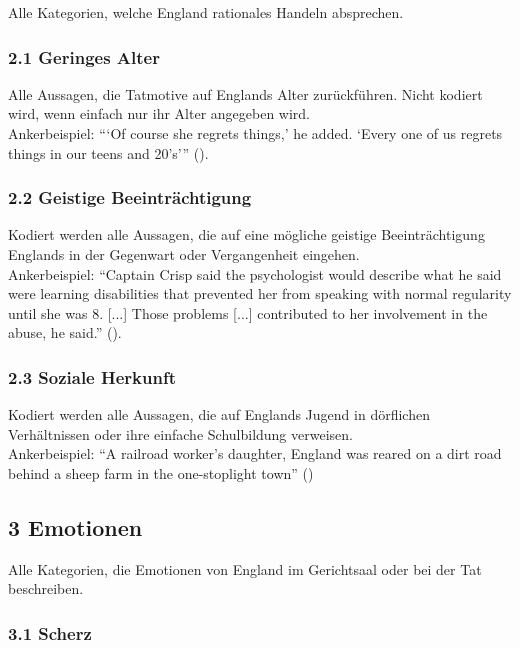 \documentclass[12pt, titlepage=true, toc=bib]{scrartcl}
\begin{document}
Alle Kategorien, welche England rationales Handeln absprechen.

\subsubsection*{2.1 Geringes Alter}

Alle Aussagen, die Tatmotive auf Englands Alter zurückführen. Nicht kodiert wird, wenn einfach nur ihr Alter angegeben wird.\\
Ankerbeispiel: \enquote{\enquote{Of course she regrets things,} he added. \enquote{Every one of us regrets things in our teens and 20's}} (\cite[3]{zernike_conflict_2004}).

\subsubsection*{2.2 Geistige Beeinträchtigung}

Kodiert werden alle Aussagen, die auf eine mögliche geistige Beeinträchtigung Englands in der Gegenwart oder Vergangenheit eingehen.\\
Ankerbeispiel: "`Captain Crisp said the psychologist would describe what he said were learning disabilities that prevented her from speaking with normal regularity until she was 8. [...] Those problems [...] contributed to her involvement in the abuse, he said."' (\cite[2-3]{cloud_g.i.s_2005}). 

\subsubsection*{2.3 Soziale Herkunft}

Kodiert werden alle Aussagen, die auf Englands Jugend in dörflichen Verhältnissen oder ihre einfache Schulbildung verweisen.\\
Ankerbeispiel: "`A railroad worker's daughter, England was reared on a dirt road behind a sheep farm in the one-stoplight town"' (\cite[2]{cohen_victimizer_2005})

\subsection*{3 Emotionen}

Alle Kategorien, die Emotionen von England im Gerichtsaal oder bei der Tat beschreiben.

\subsubsection*{3.1 Scherz}
\end{document}
